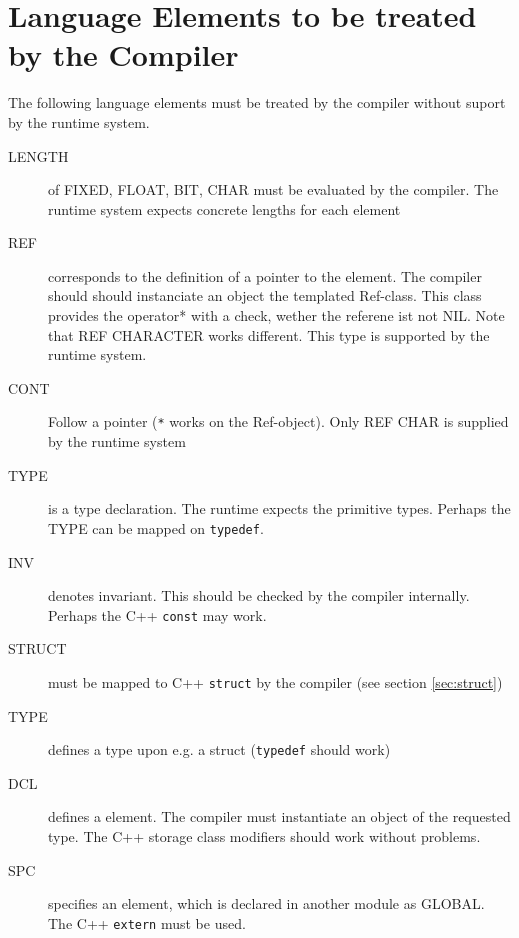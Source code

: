 \chapter{Language Elements to be treated by the Compiler}
The following language elements must be treated by the compiler 
without suport by the runtime system.

\begin{description}
\item[LENGTH] of FIXED, FLOAT, BIT, CHAR must be evaluated by the 
    compiler. The runtime system expects concrete lengths for each element
\item[REF] corresponds to the definition of a pointer to the 
    element. The compiler should should instanciate an object
    the templated Ref-class. This class provides the operator* with
    a check, wether the referene ist not NIL.
    Note that REF CHARACTER works different. This type is supported by the
    runtime system.
\item[CONT] Follow a pointer (\verb|*| works on the Ref-object). 
		Only REF CHAR is supplied by the runtime system
\item[TYPE] is a type declaration. The runtime expects the primitive types.
   Perhaps the TYPE can be mapped on \verb|typedef|.
\item[INV] denotes invariant. This should be checked by the compiler internally.
    Perhaps the C++ \verb|const| may work. 
\item[STRUCT] must be mapped to C++ \verb|struct| by the compiler 
(see section \ref{sec:struct})
\item[TYPE] defines a type  upon e.g. a struct (\verb|typedef| should work)
\item[DCL] defines a element. The compiler must instantiate an object
    of the requested type. The C++ storage class modifiers should work
    without problems.
\item[SPC] specifies an element, which is declared in another module as
  GLOBAL. The C++ \verb|extern| must be used.
\end{description}

 

